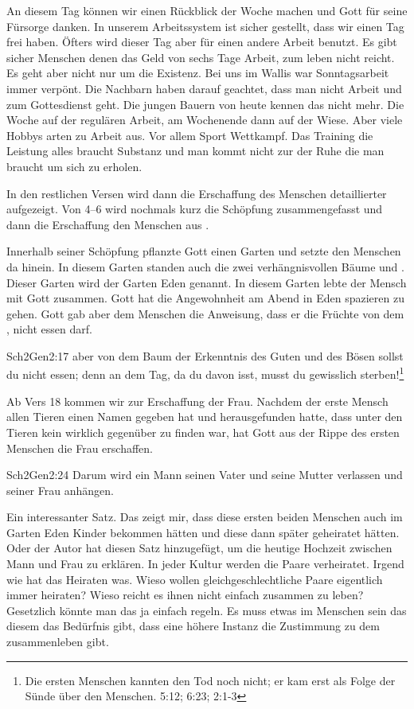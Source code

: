 An diesem Tag können wir einen Rückblick der Woche machen und Gott für seine Fürsorge danken. In unserem Arbeitssystem ist sicher gestellt, dass wir einen Tag frei haben. Öfters wird dieser Tag aber für einen andere Arbeit benutzt. Es gibt sicher Menschen denen das Geld von sechs Tage Arbeit, zum leben nicht reicht. Es geht aber nicht nur um die Existenz. Bei uns im Wallis war Sonntagsarbeit immer verpönt. Die Nachbarn haben darauf geachtet, dass man nicht Arbeit und zum Gottesdienst geht. Die jungen Bauern von heute kennen das nicht mehr. Die Woche auf der regulären Arbeit, am Wochenende dann auf der Wiese. Aber viele Hobbys arten zu Arbeit aus. Vor allem Sport Wettkampf. Das Training die Leistung alles braucht Substanz und man kommt nicht zur der Ruhe die man braucht um sich zu erholen.

In den restlichen Versen wird dann die Erschaffung des Menschen detaillierter aufgezeigt. Von 4--6 wird nochmals kurz die Schöpfung zusammengefasst und dann die Erschaffung den Menschen aus . 

Innerhalb seiner Schöpfung pflanzte Gott einen Garten und setzte den Menschen da hinein. In diesem Garten standen auch die zwei verhängnisvollen Bäume  und . Dieser Garten wird der Garten Eden genannt. In diesem Garten lebte der Mensch mit Gott zusammen. Gott hat die Angewohnheit am Abend in Eden spazieren zu gehen. Gott gab aber dem Menschen die Anweisung, dass er die Früchte von dem , nicht essen darf.
\begin{bibeltext}{Sch2}{Gen}{2:17}
	aber von dem Baum der Erkenntnis des Guten und des Bösen sollst du nicht essen; denn an dem Tag, da du davon isst, musst du gewisslich sterben!\footnote{Die ersten Menschen kannten den Tod noch nicht; er kam erst als Folge der Sünde über den Menschen.  {5:12};  {6:23};  {2:1-3}} 
\end{bibeltext}

Ab Vers 18 kommen wir zur Erschaffung der Frau. Nachdem der erste Mensch allen Tieren einen Namen gegeben hat und herausgefunden hatte, dass unter den Tieren kein wirklich gegenüber zu finden war, hat Gott aus der Rippe des ersten Menschen die Frau erschaffen. 
\begin{bibeltext}{Sch2}{Gen}{2:24}
	Darum wird ein Mann seinen Vater und seine Mutter verlassen und seiner Frau anhängen.	
\end{bibeltext}
Ein interessanter Satz. Das zeigt mir, dass diese ersten beiden Menschen auch im Garten Eden Kinder bekommen hätten und diese dann später geheiratet hätten. Oder der Autor hat diesen Satz hinzugefügt, um die heutige Hochzeit zwischen Mann und Frau zu erklären. In jeder Kultur werden die Paare verheiratet. Irgend wie hat das Heiraten was. Wieso wollen gleichgeschlechtliche Paare eigentlich immer heiraten? Wieso reicht es ihnen nicht einfach zusammen zu leben? Gesetzlich könnte man das ja einfach regeln. Es muss etwas im Menschen sein das diesem das Bedürfnis gibt, dass eine höhere Instanz die Zustimmung zu dem zusammenleben gibt.

